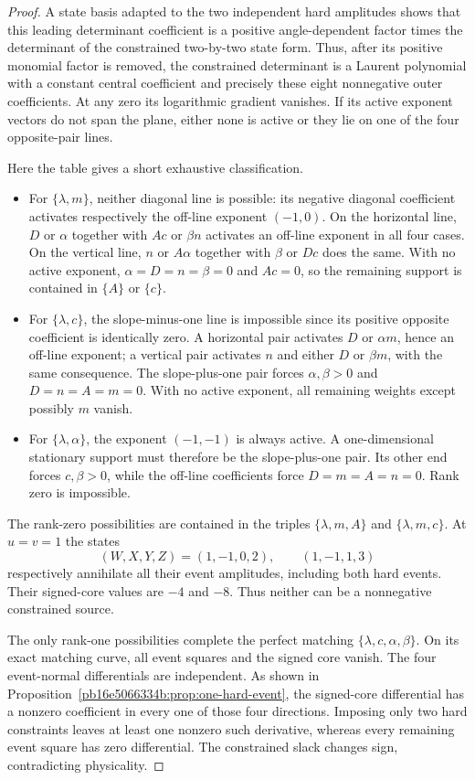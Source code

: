 \begin{proof}
A state basis adapted to the two independent hard amplitudes shows that this leading determinant coefficient is a positive angle-dependent factor times the determinant of the constrained two-by-two state form. Thus, after its positive monomial factor is removed, the constrained determinant is a Laurent polynomial with a constant central coefficient and precisely these eight nonnegative outer coefficients. At any zero its logarithmic gradient vanishes. If its active exponent vectors do not span the plane, either none is active or they lie on one of the four opposite-pair lines.

Here the table gives a short exhaustive classification.
\begin{itemize}
\item For $\{\lambda,m\}$, neither diagonal line is possible: its negative diagonal coefficient activates respectively the off-line exponent $(-1,0)$. On the horizontal line, $D$ or $\alpha$ together with $Ac$ or $\beta n$ activates an off-line exponent in all four cases. On the vertical line, $n$ or $A\alpha$ together with $\beta$ or $Dc$ does the same. With no active exponent, $\alpha=D=n=\beta=0$ and $Ac=0$, so the remaining support is contained in $\{A\}$ or $\{c\}$.
\item For $\{\lambda,c\}$, the slope-minus-one line is impossible since its positive opposite coefficient is identically zero. A horizontal pair activates $D$ or $\alpha m$, hence an off-line exponent; a vertical pair activates $n$ and either $D$ or $\beta m$, with the same consequence. The slope-plus-one pair forces $\alpha,\beta>0$ and $D=n=A=m=0$. With no active exponent, all remaining weights except possibly $m$ vanish.
\item For $\{\lambda,\alpha\}$, the exponent $(-1,-1)$ is always active. A one-dimensional stationary support must therefore be the slope-plus-one pair. Its other end forces $c,\beta>0$, while the off-line coefficients force $D=m=A=n=0$. Rank zero is impossible.
\end{itemize}

The rank-zero possibilities are contained in the triples
$\{\lambda,m,A\}$ and $\{\lambda,m,c\}$. At $u=v=1$ the states
\[
 (W,X,Y,Z)=(1,-1,0,2),\qquad(1,-1,1,3)
\]
respectively annihilate all their event amplitudes, including both hard events. Their signed-core values are $-4$ and $-8$. Thus neither can be a nonnegative constrained source.

The only rank-one possibilities complete the perfect matching
$\{\lambda,c,\alpha,\beta\}$. On its exact matching curve, all event squares and the signed core vanish. The four event-normal differentials are independent. As shown in Proposition~\ref{pb16e5066334b:prop:one-hard-event}, the signed-core differential has a nonzero coefficient in every one of those four directions. Imposing only two hard constraints leaves at least one nonzero such derivative, whereas every remaining event square has zero differential. The constrained slack changes sign, contradicting physicality.


\end{proof}
